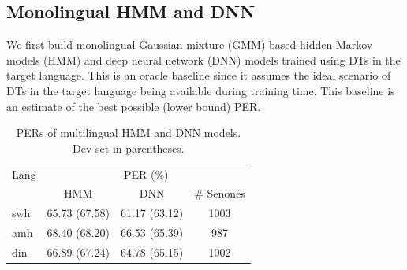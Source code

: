 \documentclass[a4paper]{article}
\begin{document}
\subsection{Monolingual HMM and DNN} \vspace{-1mm}
\label{sec:Monolingual HMM and DNN}
We first build monolingual Gaussian mixture (GMM) based hidden Markov models (HMM) and deep neural network (DNN) models trained using DTs in the target language. This is an oracle baseline since it assumes the ideal scenario of DTs in the target language being available during training time. This baseline is an estimate of the best possible (lower bound) PER.
%
\begin{table}[t!]
\centering %
\caption{PERs of multilingual HMM and DNN models. Dev set in parentheses.}
\begin{tabular}{l|c c c}
   \hline
Lang  & \multicolumn{3}{c}{PER (\%)} \\
          &  HMM & DNN & \# Senones   \\ \hline
swh      &65.73 (67.58)   &61.17 (63.12) & 1003 \\
amh      &68.40 (68.20)   &66.53 (65.39) &  987 \\ 
din     &66.89 (67.24)   &64.78 (65.15) & 1002  \\ \hline
\end{tabular}
\vspace{-5mm}
\label{Tab:PER_Mismatched_Multilingual}
\end{table}

\end{document}
